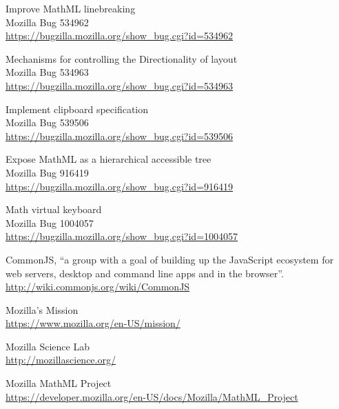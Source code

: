 \begin{thebibliography}{8}

Improve MathML linebreaking  \\
Mozilla Bug 534962 \\
\href{https://bugzilla.mozilla.org/show_bug.cgi?id=534962}{https://bugzilla.mozilla.org/show\_bug.cgi?id=534962}

Mechanisms for controlling the Directionality of layout \\
Mozilla Bug 534963 \\
\href{https://bugzilla.mozilla.org/show_bug.cgi?id=534963}{https://bugzilla.mozilla.org/show\_bug.cgi?id=534963}

Implement clipboard specification \\
Mozilla Bug 539506 \\
\href{https://bugzilla.mozilla.org/show_bug.cgi?id=539506}{https://bugzilla.mozilla.org/show\_bug.cgi?id=539506}

Expose MathML as a hierarchical accessible tree \\
Mozilla Bug 916419 \\
\href{https://bugzilla.mozilla.org/show_bug.cgi?id=916419}{https://bugzilla.mozilla.org/show\_bug.cgi?id=916419}

Math virtual keyboard \\
Mozilla Bug 1004057 \\
\href{https://bugzilla.mozilla.org/show_bug.cgi?id=1004057}{https://bugzilla.mozilla.org/show\_bug.cgi?id=1004057}

CommonJS, ``a group with a goal of building up the JavaScript ecosystem for web servers, desktop and command line apps and in the browser''. \\
\href{http://wiki.commonjs.org/wiki/CommonJS}{http://wiki.commonjs.org/wiki/CommonJS}

Mozilla's Mission \\
\href{https://www.mozilla.org/en-US/mission/}{https://www.mozilla.org/en-US/mission/}

Mozilla Science Lab \\
\href{http://mozillascience.org/}{http://mozillascience.org/}

Mozilla MathML Project \\
\href{https://developer.mozilla.org/en-US/docs/Mozilla/MathML_Project}{https://developer.mozilla.org/en-US/docs/Mozilla/MathML\_Project}


\end{thebibliography}
